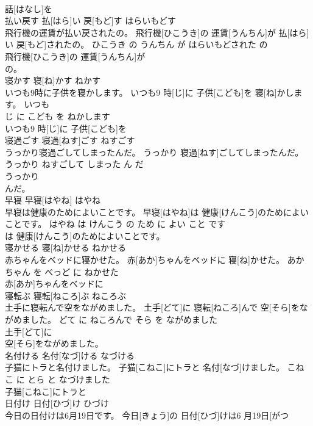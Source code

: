 \documentclass[8pt]{extreport}
\begin{document}
\begin{CJK}{UTF8}{min}
\\	話[はなし]を
\\	払い戻す	払[はら]い 戻[もど]す	はらいもどす	
\\	飛行機の運賃が払い戻されたの。	飛行機[ひこうき]の 運賃[うんちん]が 払[はら]い 戻[もど]されたの。	ひこうき の うんちん が はらいもどされた の	
\\	飛行機[ひこうき]の 運賃[うんちん]が
\\	の。			
\\	寝かす	寝[ね]かす	ねかす	
\\	いつも9時に子供を寝かします。	いつも9 時[じ]に 子供[こども]を 寝[ね]かします。	いつも 
\\	じ に こども を ねかします	
\\	いつも9 時[じ]に 子供[こども]を
\\	寝過ごす	寝過[ねす]ごす	ねすごす	
\\	うっかり寝過ごしてしまったんだ。	うっかり 寝過[ねす]ごしてしまったんだ。	うっかり ねすごして しまった ん だ	
\\	うっかり
\\	んだ。			
\\	早寝	早寝[はやね]	はやね	
\\	早寝は健康のためによいことです。	早寝[はやね]は 健康[けんこう]のためによいことです。	はやね は けんこう の ため に よい こと です	
\\	は 健康[けんこう]のためによいことです。			
\\	寝かせる	寝[ね]かせる	ねかせる	
\\	赤ちゃんをベッドに寝かせた。	赤[あか]ちゃんをベッドに 寝[ね]かせた。	あかちゃん を べっど に ねかせた	
\\	赤[あか]ちゃんをベッドに
\\	寝転ぶ	寝転[ねころ]ぶ	ねころぶ	
\\	土手に寝転んで空をながめました。	土手[どて]に 寝転[ねころ]んで 空[そら]をながめました。	どて に ねころんで そら を ながめました	
\\	土手[どて]に
\\	空[そら]をながめました。			
\\	名付ける	名付[なづ]ける	なづける	
\\	子猫にトラと名付けました。	子猫[こねこ]にトラと 名付[なづ]けました。	こねこ に とら と なづけました	
\\	子猫[こねこ]にトラと
\\	日付け	日付[ひづ]け	ひづけ	
\\	今日の日付けは6月19日です。	今日[きょう]の 日付[ひづ]けは6 月19日[がつ 

\end{CJK}
\end{document}
